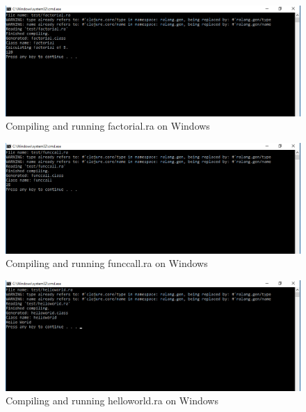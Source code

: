 \documentclass[a4paper]{article}
\begin{document}
\begin{appendices}
\begin{figure}[h!]
		\label{fig:windows_complex}
	\end{figure}
	\newpage
	\begin{figure}[h!]
		\centering
		\includegraphics[width=\linewidth]{images/windows_factorial.png}
		\caption[Compiling and running factorial.ra on Windows 10 32-bit]{Compiling and running factorial.ra on Windows}
		\label{fig:windows_factorial}
	\end{figure}
	\begin{figure}[h!]
		\centering
		\includegraphics[width=\linewidth]{images/windows_funccall.png}
		\caption[Compiling and running funccall.ra on Windows 10 32-bit]{Compiling and running funccall.ra on Windows}
		\label{fig:windows_funccall}
	\end{figure}
	\begin{figure}[h!]
		\centering
		\includegraphics[width=\linewidth]{images/windows_helloworld.png}
		\caption[Compiling and running helloworld.ra on Windows 10 32-bit]{Compiling and running helloworld.ra on Windows}
		\label{fig:windows_helloworld}
	\end{figure}

\end{appendices}
\end{document}
